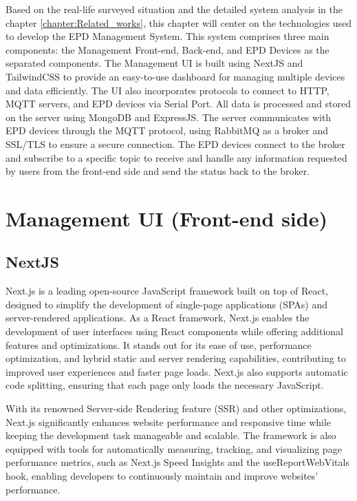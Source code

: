 \documentclass[../Main.tex]{subfiles}
\begin{document}
Based on the real-life surveyed situation and the detailed system analysis in the chapter \ref{chapter:Related_works}, this chapter will center on the technologies used to develop the \gls{EPD}  Management System. This system comprises three main components: the Management Front-end, Back-end, and \gls{EPD} Devices as the separated components. The Management UI is built using NextJS and TailwindCSS to provide an easy-to-use dashboard for managing multiple devices and data efficiently. The UI also incorporates protocols to connect to HTTP, MQTT servers, and \gls{EPD} devices via Serial Port. All data is processed and stored on the server using MongoDB and ExpressJS. The server communicates with \gls{EPD} devices through the MQTT protocol, using RabbitMQ as a broker and SSL/TLS to ensure a secure connection. The \gls{EPD} devices connect to the broker and subscribe to a specific topic to receive and handle any information requested by users from the front-end side and send the status back to the broker.

\section{Management UI (Front-end side)}
\subsection{NextJS}
Next.js is a leading open-source JavaScript framework built on top of React, designed to simplify the development of single-page applications (SPAs) and server-rendered applications. As a React framework, Next.js enables the development of user interfaces using React components while offering additional features and optimizations. It stands out for its ease of use, performance optimization, and hybrid static and server rendering capabilities, contributing to improved user experiences and faster page loads. Next.js also supports automatic code splitting, ensuring that each page only loads the necessary JavaScript.

With its renowned Server-side Rendering feature (SSR) and other optimizations, Next.js significantly enhances website performance and responsive time while keeping the development task manageable and scalable. The framework is also equipped with tools for automatically measuring, tracking, and visualizing page performance metrics, such as Next.js Speed Insights and the useReportWebVitals hook, enabling developers to continuously maintain and improve websites' performance. 
\end{document}

